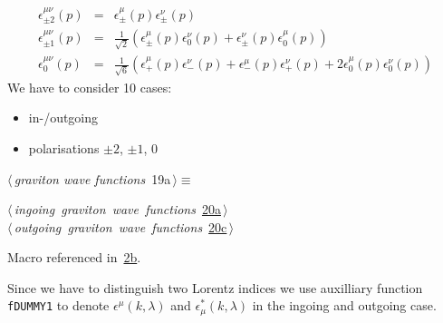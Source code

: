 \documentclass[a4paper,12pt]{amsart}
\renewcommand{\NWtarget}[2]{\hypertarget{#1}{#2}}
\renewcommand{\NWlink}[2]{\hyperlink{#1}{#2}}
\renewcommand{\NWtxtMacroRefIn}{Macro referenced in}
\renewcommand{\NWsep}{${\diamond}$}
\begin{document}
\begin{flushleft}
\begin{minipage}{\linewidth}
\begin{list}{}{\setlength{\itemsep}{-\parsep}\setlength{\itemindent}{-\leftmargin}}
\item{}
\end{list}
\end{minipage}\vspace{4ex}
\end{flushleft}
\begin{eqnarray}
\epsilon^{\mu\nu}_{\pm2}(p) &=& \epsilon_\pm^\mu(p)\epsilon_\pm^\nu(p)\\
\epsilon^{\mu\nu}_{\pm1}(p) &=& \frac1{\sqrt2}\left(
	\epsilon_\pm^\mu(p)\epsilon_0^\nu(p)
       +\epsilon_\pm^\nu(p)\epsilon_0^\mu(p)\right)\\
\epsilon^{\mu\nu}_0(p) &=&\frac1{\sqrt6}\left(
        \epsilon_+^\mu(p)\epsilon_-^\nu(p)
       +\epsilon_-^\mu(p)\epsilon_+^\nu(p)
       +2\epsilon_0^\mu(p)\epsilon_0^\nu(p)\right)
\end{eqnarray}
We have to consider 10 cases:
\begin{itemize}
\item in-/outgoing
\item polarisations $\pm2$, $\pm1$, $0$
\end{itemize}

\begin{flushleft} \small
\begin{minipage}{\linewidth}\label{scrap39}\raggedright\small
\NWtarget{nuweb19a}{} $\langle\,${\itshape graviton wave functions}\nobreak\ {\footnotesize {19a}}$\,\rangle\equiv$
\vspace{-1ex}
\begin{list}{}{} \item
\mbox{}\verb@@\hbox{$\langle\,${\itshape ingoing graviton wave functions}\nobreak\ {\footnotesize \NWlink{nuweb20a}{20a}}$\,\rangle$}\verb@@\\
\mbox{}\verb@@\hbox{$\langle\,${\itshape outgoing graviton wave functions}\nobreak\ {\footnotesize \NWlink{nuweb20c}{20c}}$\,\rangle$}\verb@@{\NWsep}
\end{list}
\vspace{-1.5ex}
\footnotesize
\begin{list}{}{\setlength{\itemsep}{-\parsep}\setlength{\itemindent}{-\leftmargin}}
\item \NWtxtMacroRefIn\ \NWlink{nuweb2b}{2b}.

\item{}
\end{list}
\end{minipage}\vspace{4ex}
\end{flushleft}
Since we have to distinguish two Lorentz indices we use
auxilliary function \texttt{fDUMMY1}
to denote $\epsilon^\mu(k,\lambda)$ and $\epsilon^\ast_\mu(k,\lambda)$
in the ingoing and outgoing case.
\end{document}
